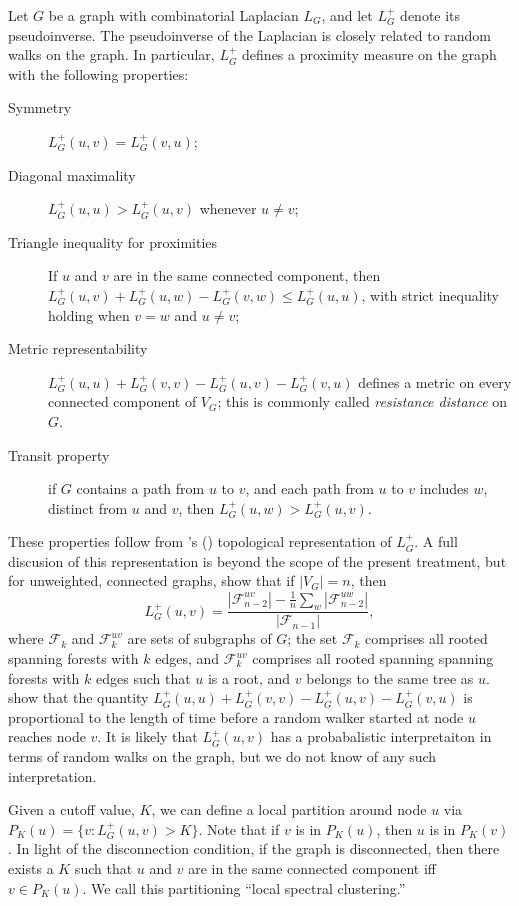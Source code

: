 \documentclass[12pt]{article}
\theoremstyle{plain}
\begin{document}
Let $G$ be a graph with combinatorial Laplacian $L_G$, and let
$L_G^+$ denote its pseudoinverse. The pseudoinverse of the Laplacian is closely
related to random walks on the graph.  In particular, 
$L_{G}^{+}$ defines a proximity measure on the graph with the
following properties:
\begin{description}
  \item[Symmetry]
    $L_G^{+}(u,v) = L_G^{+}(v,u)$;
 \item[Diagonal maximality]
    $L_G^{+}(u,u) > L_G^{+} (u,v)$ whenever $u \neq v$;
  \item[Triangle inequality for proximities]
    If $u$ and $v$ are in the same connected component, then
    $L_G^{+} (u,v) + L_G^{+} (u,w) - L_G^{+} (v,w) \leq L_G^{+} (u,u)$, with strict inequality
    holding when $v = w$ and $u \neq v$;
  \item[Metric representability]
   $L_G^{+} (u,u) + L_G^{+} (v,v) - L_G^{+} (u,v) - L_G^{+} (v,u)$
    defines a metric on every connected component of $V_G$;  this is commonly called
    \emph{resistance distance} on $G$.
 \item[Transit property]
    if $G$ contains a path from $u$ to $v$, and each path from $u$ to
    $v$ includes $w$, distinct from $u$ and $v$, then $L_G^{+}(u,w) >
    L_G^{+}(u,v)$.
\end{description}
These properties follow from 's
(\citeyear{chebotarev1998proximity}) topological representation of
$L_G^{+}$.  A full discusion of this representation is beyond the
scope of the present treatment, but for unweighted, connected graphs,
 show that if $|V_G| = n$,
then
\[
  L_G^{+}(u,v) = \frac{|\mathcal{F}_{n-2}^{uv}| - \frac{1}{n}
    \sum_{w} |\mathcal{F}_{n-2}^{uw}|}{|\mathcal{F}_{n-1}|},
\]
where $\mathcal{F}_k$ and $\mathcal{F}_k^{uv}$ are sets of subgraphs
of $G$; the set $\mathcal{F}_{k}$ comprises all rooted spanning forests
with $k$ edges, and $\mathcal{F}_{k}^{uv}$ comprises all rooted spanning
spanning forests with $k$ edges such that $u$ is a root, and $v$
belongs to the same tree as $u$.  \cite{chandra1989electrical} show that the
quantity
$L_G^{+} (u,u) + L_G^{+} (v,v) - L_G^{+} (u,v) - L_G^{+} (v,u)$ is
proportional to the length of time before a random walker started at
node $u$ reaches node $v$.  It is likely that $L_G^{+}(u,v)$ has a
probabalistic interpretaiton in terms of random walks on the graph,
but we do not know of any such interpretation.

Given a cutoff value, $K$, we can define a local partition around node
$u$ via $P_K(u) = \{ v : L_G^{+}(u,v) > K \}$.  Note that if $v$ is in
$P_K(u)$, then $u$ is in $P_K(v)$.  In light of the disconnection
condition, if the graph is disconnected, then there exists a $K$ such
that $u$ and $v$ are in the same connected component iff
$v \in P_K(u)$.  We call this partitioning ``local spectral
clustering.''
\end{document}

